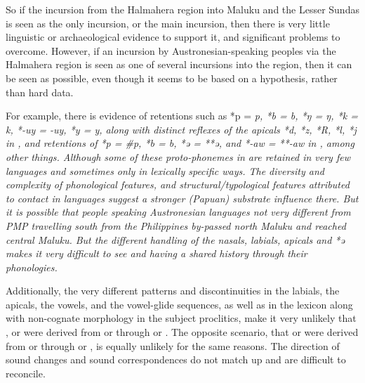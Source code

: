 So if the incursion from the Halmahera region into Maluku
and the Lesser Sundas is seen as the only incursion,
or the main incursion,
then there is very little linguistic or archaeological evidence
to support it, and significant problems to overcome.
However, if an incursion by Austronesian-speaking peoples via
the Halmahera region is seen as one of several incursions into
the region, then it can be seen as possible,
even though it seems to be based on a hypothesis,
rather than hard data.

For example, there is evidence of retentions such as *p = \it{p},
*b = \it{b}, *ŋ = \it{ŋ},
*k = \it{k}, *-uy = \it{-uy},
*y = \it{y}, along with distinct reflexes of the apicals *d,
*z, *R, *l, *j in , and retentions of *p = {\#}p,
*b = \it{b}, *ə = **ə,
and *-aw = **-aw in ,
among other things.
Although some of these proto-phonemes in  are retained
in very few languages
and sometimes only in lexically specific ways.
The diversity and complexity of phonological features,
and structural/typological features attributed to contact in
 languages suggest a stronger (Papuan) substrate influence there.
But it is possible that people speaking Austronesian languages
not very different from PMP travelling south from the Philippines
by-passed north Maluku and reached central Maluku.
But the different handling of the nasals,
labials, apicals and *ə makes it very difficult to see 
and  having a shared history through their phonologies.

Additionally, the very different patterns
and discontinuities in the labials,
the apicals, the vowels,
and the vowel-glide sequences,
as well as in the lexicon along with non-cognate morphology in
the subject proclitics, make it very unlikely that ,
or  were derived from or through  or .
The opposite scenario, that  or 
were derived from or through  or ,
is equally unlikely for the same reasons.
The direction of sound changes
and sound correspondences do not match up
and are difficult to reconcile.
